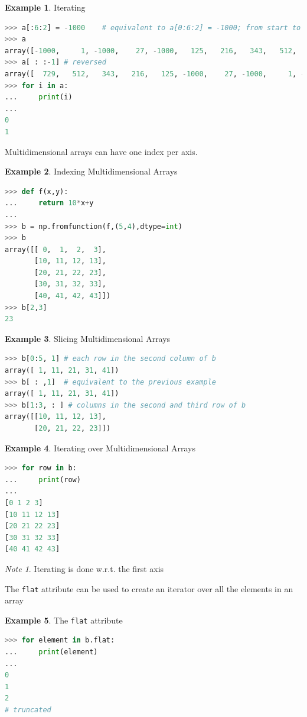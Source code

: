 \documentclass{article}
\theoremstyle{definition}
\newtheorem{ex}{Example}[subsection]
\theoremstyle{remark}
\newtheorem*{nb}{Note}
\begin{document}
\begin{ex}Iterating
\begin{lstlisting}[language=Python]
>>> a[:6:2] = -1000    # equivalent to a[0:6:2] = -1000; from start to position 6, exclusive, set every 2nd element to -1000
>>> a
array([-1000,     1, -1000,    27, -1000,   125,   216,   343,   512,   729])
>>> a[ : :-1] # reversed
array([  729,   512,   343,   216,   125, -1000,    27, -1000,     1, -1000])
>>> for i in a:
...     print(i)
...
0
1
\end{lstlisting}
\end{ex}

\noindent Multidimensional arrays can have one index per axis.

\begin{ex}Indexing Multidimensional Arrays
\begin{lstlisting}[language=Python]
>>> def f(x,y):
...     return 10*x+y
...
>>> b = np.fromfunction(f,(5,4),dtype=int)
>>> b
array([[ 0,  1,  2,  3],
       [10, 11, 12, 13],
       [20, 21, 22, 23],
       [30, 31, 32, 33],
       [40, 41, 42, 43]])
>>> b[2,3]
23
\end{lstlisting}
\end{ex}

\begin{ex}Slicing Multidimensional Arrays
\begin{lstlisting}[language=Python]
>>> b[0:5, 1] # each row in the second column of b
array([ 1, 11, 21, 31, 41])
>>> b[ : ,1]  # equivalent to the previous example
array([ 1, 11, 21, 31, 41])
>>> b[1:3, : ] # columns in the second and third row of b
array([[10, 11, 12, 13],
       [20, 21, 22, 23]])
\end{lstlisting}
\end{ex}

\begin{ex} Iterating over Multidimensional Arrays
\begin{lstlisting}[language=Python]
>>> for row in b:
...     print(row)
...
[0 1 2 3]
[10 11 12 13]
[20 21 22 23]
[30 31 32 33]
[40 41 42 43]
\end{lstlisting}
\end{ex}

\begin{nb}
    Iterating is done w.r.t. the first axis
\end{nb}

The \lstinline{flat} attribute can be used to create an iterator over all the elements in an array

\begin{ex}The \lstinline{flat} attribute
\begin{lstlisting}[language=Python]
>>> for element in b.flat:
...     print(element)
...
0
1
2
# truncated
\end{lstlisting}
\end{ex}
\end{document}
